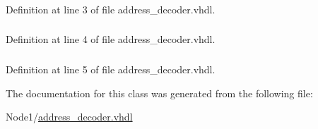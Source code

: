 \subsubsection[{\texorpdfstring{std\+\_\+logic\+\_\+1164}{std_logic_1164}}]{\hspace{0.3cm}{\ttfamily [Package]}}\hypertarget{classaddress__decoder_a857dcc5744990407561591d2d5707aa6}{}\label{classaddress__decoder_a857dcc5744990407561591d2d5707aa6}


Definition at line 3 of file address\+\_\+decoder.\+vhdl.

\subsubsection[{\texorpdfstring{std\+\_\+logic\+\_\+arith}{std_logic_arith}}]{\hspace{0.3cm}{\ttfamily [Package]}}\hypertarget{classaddress__decoder_abad2c79fa67df291d77257264ebeb001}{}\label{classaddress__decoder_abad2c79fa67df291d77257264ebeb001}


Definition at line 4 of file address\+\_\+decoder.\+vhdl.

\subsubsection[{\texorpdfstring{std\+\_\+logic\+\_\+unsigned}{std_logic_unsigned}}]{\hspace{0.3cm}{\ttfamily [Package]}}\hypertarget{classaddress__decoder_a267da23b46488123df8cd107a646dbb5}{}\label{classaddress__decoder_a267da23b46488123df8cd107a646dbb5}


Definition at line 5 of file address\+\_\+decoder.\+vhdl.



The documentation for this class was generated from the following file\+:\begin{DoxyCompactItemize}
\item 
Node1/\hyperlink{address__decoder_8vhdl}{address\+\_\+decoder.\+vhdl}\end{DoxyCompactItemize}
